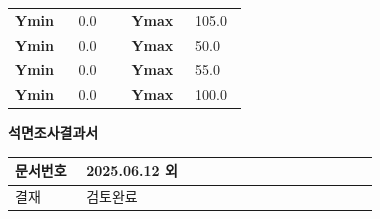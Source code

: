 \documentclass[UTF8,10pt,a4paper,fontset=fandol]{ctexart}
\newcommand{\fieldvalue}[1]{#1}
\newcommand{\handwritten}[1]{#1}
\begin{document}
\noindent
\begin{tabular}{@{}p{0.24\linewidth}p{0.20\linewidth}p{0.24\linewidth}p{0.20\linewidth}@{}}
\textbf{Ymin} &
\fieldvalue{0.0}
&
\textbf{Ymax} &
\fieldvalue{105.0}
\\[0.35em]
\textbf{Ymin} &
\fieldvalue{0.0}
&
\textbf{Ymax} &
\fieldvalue{50.0}
\\[0.35em]
\textbf{Ymin} &
\fieldvalue{0.0}
&
\textbf{Ymax} &
\fieldvalue{55.0}
\\[0.35em]
\textbf{Ymin} &
\fieldvalue{0.0}
&
\textbf{Ymax} &
\fieldvalue{100.0}
\end{tabular}

\vspace{1em}

\begin{center}
\setlength{\fboxsep}{8pt}
\end{center}


\newpage

\begin{center}
\textbf{석면조사결과서}
\end{center}


\noindent
\begin{tabular}{|p{0.18\linewidth}|p{0.74\linewidth}|}
\hline
문서번호 &
\fieldvalue{\handwritten{2025.06.12 외}} \\ \hline
결재 &
\fieldvalue{\handwritten{검토완료}} \\ \hline
\end{tabular}
\end{document}
